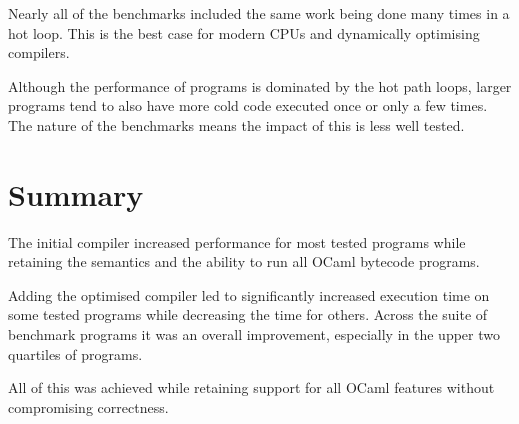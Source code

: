 Nearly all of the benchmarks included the same work being done many times in a hot loop. This is
the best case for modern CPUs and dynamically optimising compilers.

Although the performance of programs is dominated by the hot path loops, larger programs tend to
also have more cold code executed once or only a few times. The nature of the benchmarks means the
impact of this is less well tested.

\section{Summary}

The initial compiler increased performance for most tested programs while retaining the semantics
and the ability to run all OCaml bytecode programs.

Adding the optimised compiler led to significantly increased execution time on some tested programs
while decreasing the time for others. Across the suite of benchmark programs it was an overall
improvement, especially in the upper two quartiles of programs.

All of this was achieved while retaining support for all OCaml features without compromising
correctness.